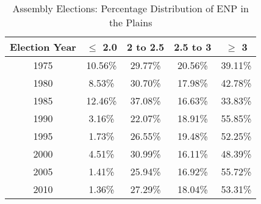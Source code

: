     \begin{table}[h]
        \centering
        \begin{tabular}{|c|c|c|c|c|}
        \hline
        Election Year & $\leq$ 2.0 & 2 to 2.5 & 2.5 to 3 & $\geq$ 3 \\ \hline
        1975 & 10.56\% & 29.77\% & 20.56\% & 39.11\% \\ \hline
        1980 & 8.53\% & 30.70\% & 17.98\% & 42.78\% \\ \hline
        1985 & 12.46\% & 37.08\% & 16.63\% & 33.83\% \\ \hline
        1990 & 3.16\% & 22.07\% & 18.91\% & 55.85\% \\ \hline
        1995 & 1.73\% & 26.55\% & 19.48\% & 52.25\% \\ \hline
        2000 & 4.51\% & 30.99\% & 16.11\% & 48.39\% \\ \hline
        2005 & 1.41\% & 25.94\% & 16.92\% & 55.72\% \\ \hline
        2010 & 1.36\% & 27.29\% & 18.04\% & 53.31\% \\ \hline
        \end{tabular}
        \caption{Assembly Elections: Percentage Distribution of ENP in the Plains}
        \label{tab:assembly_plains_percentage_district}
        \end{table}

        \begin{table}[h!]
            \centering
            \label{tab:assembly_disaggregated_mountain_plain_comparison}
            \caption{Assembly Elections: Disaggregated ENP values}
            \end{table}
             
